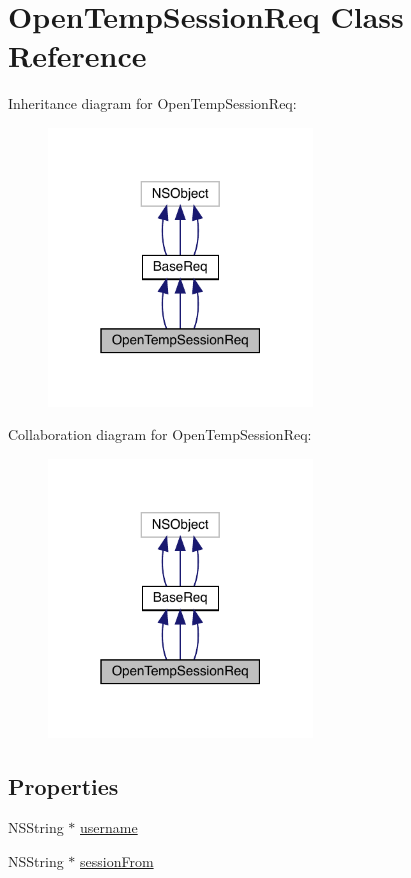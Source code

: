 \hypertarget{interface_open_temp_session_req}{}\section{Open\+Temp\+Session\+Req Class Reference}
\label{interface_open_temp_session_req}


Inheritance diagram for Open\+Temp\+Session\+Req\+:\nopagebreak
\begin{figure}[H]
\begin{center}
\leavevmode
\includegraphics[width=199pt]{interface_open_temp_session_req__inherit__graph}
\end{center}
\end{figure}


Collaboration diagram for Open\+Temp\+Session\+Req\+:\nopagebreak
\begin{figure}[H]
\begin{center}
\leavevmode
\includegraphics[width=199pt]{interface_open_temp_session_req__coll__graph}
\end{center}
\end{figure}
\subsection*{Properties}
\begin{DoxyCompactItemize}
\item 
N\+S\+String $\ast$ \mbox{\hyperlink{interface_open_temp_session_req_acf03474890a4c03bf442fbd97094931b}{username}}
\item 
N\+S\+String $\ast$ \mbox{\hyperlink{interface_open_temp_session_req_a9f5ba3fecdd55e5bdc51990c563fabf8}{session\+From}}
\end{DoxyCompactItemize}


